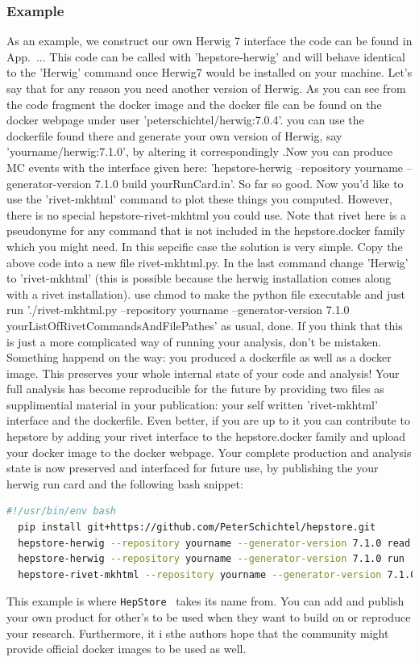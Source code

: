 \documentclass[aps,prd,11pt,tightenlines,superscriptaddress,nofootinbib,preprintnumbers,notitlepage]{revtex4-1}
\newcommand{\hepstore}{\texttt{HepStore}}
\begin{document}
\subsubsection{Example}

As an example, we construct our own Herwig 7 interface the code can be found in App.~... This code can be called with 'hepstore-herwig' and will behave identical to the 'Herwig' command once Herwig7 would be installed on your machine. Let's say that for any reason you need another version of Herwig. As you can see from the code fragment the docker image and the docker file can be found on the docker webpage under user 'peterschichtel/herwig:7.0.4'. you can use the dockerfile found there and generate your own version of Herwig, say 'yourname/herwig:7.1.0', by altering it correspondingly .Now you can produce MC events with the interface given here: 'hepstore-herwig --repository yourname --generator-version 7.1.0 build yourRunCard.in'. So far so good. Now you'd like to use the 'rivet-mkhtml' command to plot these things you computed. However, there is no special hepstore-rivet-mkhtml you could use. Note that rivet here is a pseudonyme for any command that is not included in the hepstore.docker family which you might need. In this sepcific case the solution is very simple. Copy the above code into a new file rivet-mkhtml.py. In the last command change 'Herwig' to 'rivet-mkhtml' (this is possible because the herwig installation comes along with a rivet installation). use chmod to make the python file executable and just run './rivet-mkhtml.py --repository yourname --generator-version 7.1.0 yourListOfRivetCommandsAndFilePathes' as usual, done. If you think that this is just a more complicated way of running your analysis, don't be mistaken. Something happend on the way: you produced a dockerfile as well as a docker image. This preserves your whole internal state of your code and analysis! Your full analysis has become reproducible for the future by providing two files as supplimential material in your publication: your self written 'rivet-mkhtml' interface and the dockerfile. Even better, if you are up to it you can contribute to hepstore by adding your rivet interface to the hepstore.docker family and upload your docker image to the docker webpage. Your complete production and analysis state is now preserved and interfaced for future use, by publishing the your herwig run card and the following bash snippet:
%
\begin{lstlisting}[language=Bash]
  #!/usr/bin/env bash
  pip install git+https://github.com/PeterSchichtel/hepstore.git
  hepstore-herwig --repository yourname --generator-version 7.1.0 read yourRunCard.in
  hepstore-herwig --repository yourname --generator-version 7.1.0 run  yourRunCard.run
  hepstore-rivet-mkhtml --repository yourname --generator-version 7.1.0 yourListOfRivetCommandsAndFilePathes
\end{lstlisting}
%
This example is where \hepstore~ takes its name from. You can add and publish your own product for other's to be used when they want to build on or reproduce your research. Furthermore, it i sthe authors hope that the community might provide official docker images to be used as well.
\end{document}
